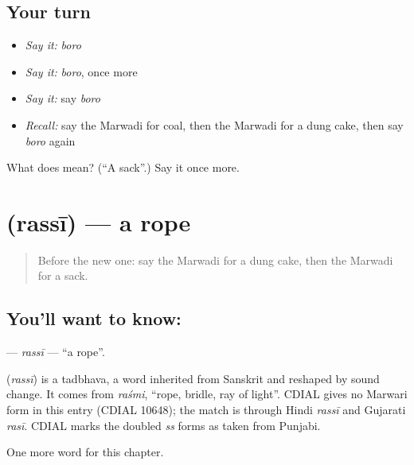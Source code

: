 \subsection*{Your turn}
\begin{itemize}
\raggedright
  \item \emph{Say it:} \emph{boro}
  \item \emph{Say it:} \emph{boro}, once more
  \item \emph{Say it:} say \emph{boro}
  \item \emph{Recall:} say the Marwadi for coal, then the Marwadi for a dung cake, then say \emph{boro} again
\end{itemize}

\begin{tcolorbox}[breakable,colback=teal!4,colframe=teal!35!black,title={Before you move on}]
What does  mean? (\textquotedblleft{}A sack\textquotedblright{}.) Say it once more.
\end{tcolorbox}
\section[\texorpdfstring{\mw{रस्सी} (rassī)}{रस्सी (rassī)}]{ (rassī) — a rope}

\label{lesson:MW-C126-rassi}



\begin{quote}
Before the new one: say the Marwadi for a dung cake, then the Marwadi for a sack.
\end{quote}

\subsection*{You'll want to know: }
\textbf{} — \emph{rassī} — \textquotedblleft{}a rope\textquotedblright{}.

\begin{cousinweb}
\textbf{} (\emph{rassī}) is a tadbhava, a word inherited from Sanskrit and reshaped by sound change. It comes from \emph{raśmi}, \textquotedblleft{}rope, bridle, ray of light\textquotedblright{}. CDIAL gives no Marwari form in this entry (CDIAL 10648); the match is through Hindi \emph{rassī} and Gujarati \emph{rasī}. CDIAL marks the doubled \emph{ss} forms as taken from Punjabi.
\end{cousinweb}

\begin{grammarlens}[title={What you've built}]
One more word for this chapter.
\end{grammarlens}


